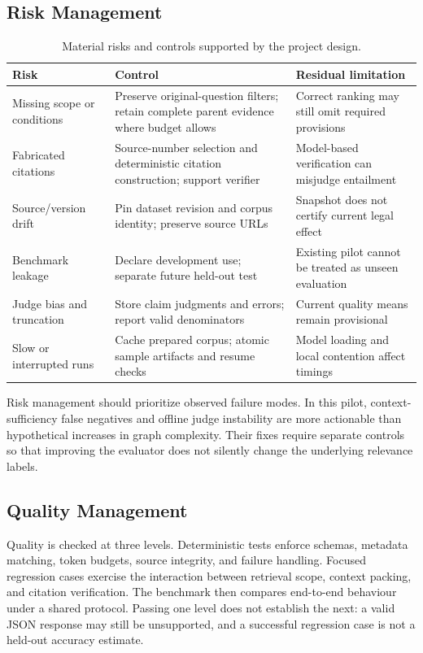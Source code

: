 \documentclass[11pt,a4paper,oneside]{report}
\begin{document}
\subsection{Risk Management}
\begin{table}[H]\centering\small
\caption{Material risks and controls supported by the project design.}\label{tab:risks}
\begin{tabularx}{\textwidth}{P{3.1cm}YY}\toprule
\textbf{Risk} & \textbf{Control} & \textbf{Residual limitation}\\\midrule
Missing scope or conditions & Preserve original-question filters; retain complete parent evidence where budget allows & Correct ranking may still omit required provisions\\
Fabricated citations & Source-number selection and deterministic citation construction; support verifier & Model-based verification can misjudge entailment\\
Source/version drift & Pin dataset revision and corpus identity; preserve source URLs & Snapshot does not certify current legal effect\\
Benchmark leakage & Declare development use; separate future held-out test & Existing pilot cannot be treated as unseen evaluation\\
Judge bias and truncation & Store claim judgments and errors; report valid denominators & Current quality means remain provisional\\
Slow or interrupted runs & Cache prepared corpus; atomic sample artifacts and resume checks & Model loading and local contention affect timings\\\bottomrule
\end{tabularx}
\end{table}
Risk management should prioritize observed failure modes. In this pilot, context-sufficiency false negatives and offline judge instability are more actionable than hypothetical increases in graph complexity. Their fixes require separate controls so that improving the evaluator does not silently change the underlying relevance labels.

\subsection{Quality Management}
Quality is checked at three levels. Deterministic tests enforce schemas, metadata matching, token budgets, source integrity, and failure handling. Focused regression cases exercise the interaction between retrieval scope, context packing, and citation verification. The benchmark then compares end-to-end behaviour under a shared protocol. Passing one level does not establish the next: a valid JSON response may still be unsupported, and a successful regression case is not a held-out accuracy estimate.
\end{document}
